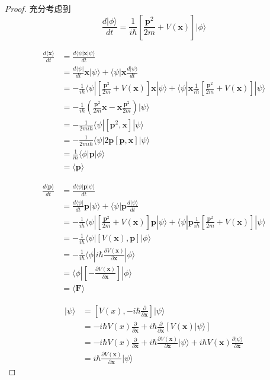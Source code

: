 \documentclass{article}
\newtheorem{proof}{Proof}[section]
\numberwithin{equation}{section}
\newcommand{\bra}[1]{\langle #1 |}
\newcommand{\ket}[1]{| #1 \rangle}
\newcommand{\bracketl}[3]{\langle #1 | #2 | #3 \rangle}
\newcommand{\mean}[1]{\langle #1 \rangle}
\begin{document}
\begin{proof}
  充分考虑到
  \begin{equation}
  \frac{d\ket{\phi}}{dt}=\frac{1}{i\hbar}[\frac{\textbf{p}^2}{2m}+V(\textbf{x})]\ket{\phi}
  \end{equation}

  \begin{align*}
  \frac{d \mean{\textbf{x}}}{dt}  & = \frac{d \bracketl{\psi}{\textbf{x}}{\psi}}{dt} \\ 
  & = \frac{d\bra{\psi}}{dt} \textbf{x} \ket{\psi} + \bra{\psi} \textbf{x} \frac{d\ket{\psi}}{dt} \\
  &= - \frac{1}{i \hbar}\bra{\psi}[\frac{\textbf{p}^2}{2m}+V(\textbf{x})]\textbf{x}\ket{\psi}+ \bra{\psi}\textbf{x}\frac{1}{i\hbar}[\frac{\textbf{p}^2}{2m}+V(\textbf{x})]\ket{\psi}\\
  &= -\frac{1}{i\hbar}(\frac{\textbf{p}^2}{2m}\textbf{x}-\textbf{x}\frac{\textbf{p}^2}{2m})\ket{\psi}\\
  &= -\frac{1}{2mi\hbar}\bracketl{\psi}{[\textbf{p}^2,\textbf{x}]}{\psi}\\
  &=-\frac{1}{2mi\hbar}\bracketl{\psi}{2\textbf{p}[\textbf{p},\textbf{x}]}{\psi}\\
  &=\frac{1}{m}\bracketl{\phi}{\textbf{p}}{\phi}\\
  &=\mean{\textbf{p}}
  \end{align*}

  \begin{align*}
  \frac{d\mean{\textbf{p}}}{dt} &= \frac{d\bracketl{\psi}{\textbf{p}}{\psi}}{dt}\\
  &=\frac{d\bra{\psi}}{dt} \textbf{p} \ket{\psi} + \bra{\psi} \textbf{p} \frac{d\ket{\psi}}{dt} \\
  &= - \frac{1}{i \hbar}\bra{\psi}[\frac{\textbf{p}^2}{2m}+V(\textbf{x})]\textbf{p}\ket{\psi}+ \bra{\psi}\textbf{p}\frac{1}{i\hbar}[\frac{\textbf{p}^2}{2m}+V(\textbf{x})]\ket{\psi}\\
  &= -\frac{1}{i\hbar}\bracketl{\psi}{[V(\textbf{x}),\textbf{p}]}{\phi} \\
  & = -\frac{1}{i\hbar}\bracketl{\phi}{i\hbar\frac{\partial V(\textbf{x})}{\partial \textbf{x}}}{\phi}\\
  & = \bracketl{\phi}{[-\frac{\partial V(\textbf{x})}{\partial \textbf{x}}]}{\phi}\\
  & = \mean{\textbf{F}}
  \end{align*}

  \begin{align*}
  [V(\textbf{x}),\textbf{p}] \ket{\psi} & = [V(x),-i\hbar \frac{\partial}{\partial \textbf{x}}]\ket{\psi}\\
  & = -i\hbar V(x) \frac{\partial }{\partial \textbf{x}} + i\hbar \frac{\partial}{\partial \textbf{x}}[V(\textbf{x})\ket{\psi}]\\
  &= -i\hbar V(x) \frac{\partial }{\partial \textbf{x}}+ i\hbar \frac{\partial V(\textbf{x})}{\partial \textbf{x}}\ket{\psi} + i\hbar V(\textbf{x}) \frac{\partial \ket{\psi}}{\partial \textbf{x}}\\
  &= i\hbar \frac{\partial V(\textbf{x})}{\partial \textbf{x}} \ket{\psi}
  \end{align*}
  \end{proof}
\end{document}
